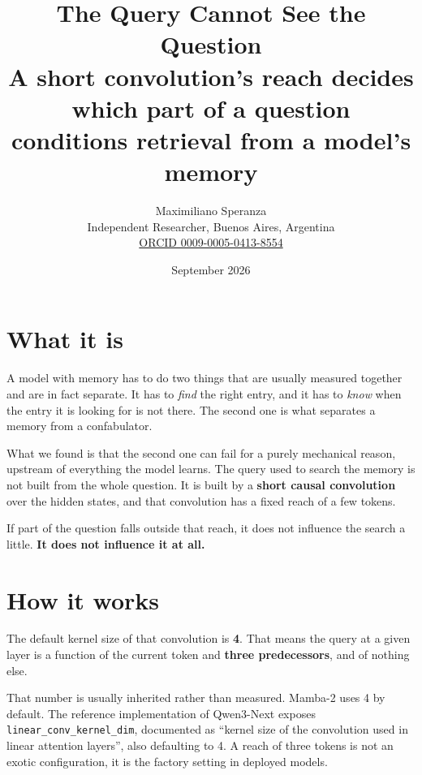 \documentclass[11pt,a4paper]{article}
\title{\bfseries The Query Cannot See the Question\\[0.3em]
\large A short convolution's reach decides which part of a question\\
conditions retrieval from a model's memory}
\author{Maximiliano Speranza\\
\small Independent Researcher, Buenos Aires, Argentina\\
\small \href{https://orcid.org/0009-0005-0413-8554}{ORCID 0009-0005-0413-8554}}
\date{September 2026}
\begin{document}
\maketitle

\begin{center}
\end{center}

\section{What it is}

A model with memory has to do two things that are usually measured together and are in fact separate.
It has to \emph{find} the right entry, and it has to \emph{know} when the entry it is looking for is
not there. The second one is what separates a memory from a confabulator.

What we found is that the second one can fail for a purely mechanical reason, upstream of everything
the model learns. The query used to search the memory is not built from the whole question. It is
built by a \textbf{short causal convolution} over the hidden states, and that convolution has a fixed
reach of a few tokens.

If part of the question falls outside that reach, it does not influence the search a little.
\textbf{It does not influence it at all.}

\section{How it works}

The default kernel size of that convolution is \textbf{4}. That means the query at a given layer is a
function of the current token and \textbf{three predecessors}, and of nothing else.

That number is usually inherited rather than measured. Mamba-2 uses 4 by default. The reference
implementation of Qwen3-Next exposes \texttt{linear\_conv\_kernel\_dim}, documented as ``kernel size
of the convolution used in linear attention layers'', also defaulting to 4. A reach of three tokens is
not an exotic configuration, it is the factory setting in deployed models.
\end{document}
